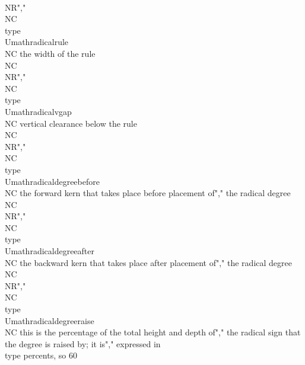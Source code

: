 \\NR","\\NC \\type {\\Umathradicalrule}        \\NC the width of the rule \\NC \\NR","\\NC \\type {\\Umathradicalvgap}        \\NC vertical clearance below the rule \\NC \\NR","\\NC \\type {\\Umathradicaldegreebefore}\\NC the forward kern that takes place before placement of","                                       the radical degree \\NC \\NR","\\NC \\type {\\Umathradicaldegreeafter} \\NC the backward kern that takes place after placement of","                                       the radical degree \\NC \\NR","\\NC \\type {\\Umathradicaldegreeraise} \\NC this is the percentage of the total height and depth of","                                       the radical sign that the degree is raised by; it is","                                       expressed in \\type {percents}, so 60\\%